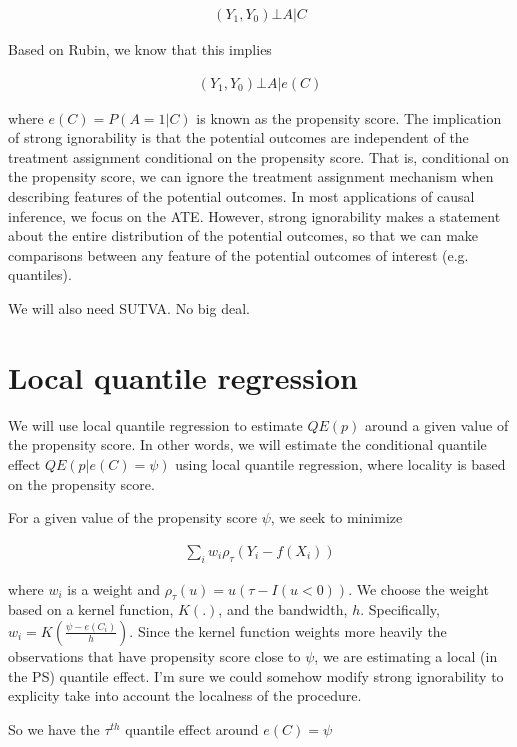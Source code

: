\documentclass{article}\usepackage[]{graphicx}\usepackage[]{color}
\begin{document}
\begin{align*}
  (Y_1,Y_0) \bot A | C
\end{align*}

\noindent Based on Rubin, we know that this implies 

\begin{align*}
  (Y_1,Y_0) \bot A | e(C)
\end{align*}

\noindent where $e(C)=P(A=1|C)$ is known as the propensity score. The implication of strong ignorability is that the potential outcomes are independent of the treatment assignment conditional on the propensity score. That is, conditional on the propensity score, we can ignore the treatment assignment mechanism when describing features of the potential outcomes. In most applications of causal inference, we focus on the ATE. However, strong ignorability makes a statement about the entire distribution of the potential outcomes, so that we can make comparisons between any feature of the potential outcomes of interest (e.g. quantiles). 

We will also need SUTVA. No big deal.

\section{Local quantile regression}

We will use local quantile regression to estimate $QE(p)$ around a given value of the propensity score. In other words, we will estimate the conditional quantile effect $QE(p|e(C)=\psi)$ using local quantile regression, where locality is based on the propensity score.

For a given value of the propensity score $\psi$, we seek to minimize

\begin{align*}
  \sum_i w_i \rho_\tau( Y_i - f(X_i))
\end{align*}

where $w_i$ is a weight and $\rho_\tau(u)=u(\tau-I(u<0))$. We choose the weight based on a kernel function, $K(.)$, and the bandwidth, $h$. Specifically, $w_i=K( \frac{\psi-e(C_i)}{h})$. Since the kernel function weights more heavily the observations that have propensity score close to $\psi$, we are estimating a local (in the PS) quantile effect. I'm sure we could somehow modify strong ignorability to explicity take into account the localness of the procedure. 

So we have the $\tau^{th}$ quantile effect around $e(C)=\psi$
\end{document}
